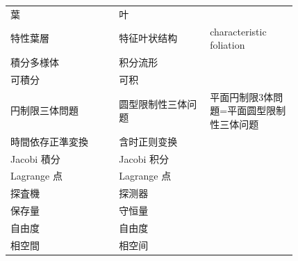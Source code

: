 {\begin{longtable}{p{0.31\linewidth} p{0.26\linewidth} p{0.25\linewidth}}
葉 & 叶 &  \\
特性葉層 & 特征叶状结构 & characteristic foliation \\
積分多様体 & 积分流形 &  \\
可積分 & 可积 &  \\
円制限三体問題 & 圆型限制性三体问题 & 平面円制限3体問題=平面圆型限制性三体问题 \\
時間依存正準変換 & 含时正则变换 &  \\
Jacobi 積分 & Jacobi 积分 &  \\
Lagrange 点 & Lagrange 点 &  \\
探査機 & 探测器 &  \\
保存量 & 守恒量 &  \\
自由度 & 自由度 &  \\
相空間 & 相空间 &  \\
\bottomrule
\end{longtable}
}

